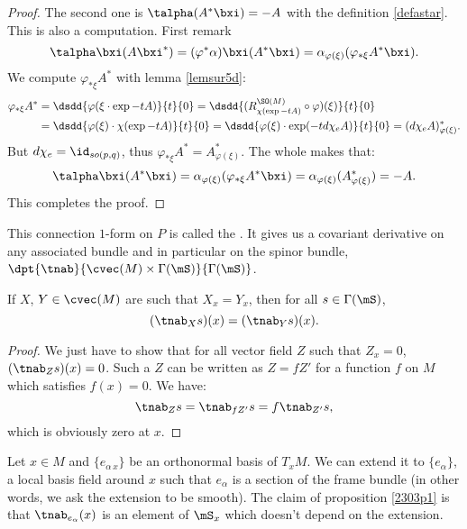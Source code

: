\begin{proof}
The second one is $\talpha(A^*\bxi)=-A$ with the definition \eqref{defastar}. This is also a computation. First remark
\[
 \talpha\bxi(A\bxi^*)=(\varphi^*\alpha)\bxi(A^*\bxi)=\alpha_{\varphi(\xi)}(\varphi_{*\xi}A^*\bxi).
\]
 We compute $\varphi_{*\xi}A^*$ with lemma \ref{lemsur5d}:
\begin{equation}
\begin{split}
 \varphi_{*\xi}A^*&=\dsdd{\varphi(\xi\cdot\exp -tA)}{t}{0} =\dsdd{(R_{\chi(\exp -tA)}^{\SO(M)}\circ\varphi)(\xi)}{t}{0}\\
              &=\dsdd{\varphi(\xi)\cdot\chi(\exp -tA)}{t}{0}=\dsdd{\varphi(\xi)\cdot\exp(-td\chi_eA)}{t}{0}=(d\chi_eA)^*_{\varphi(\xi)}.
\end{split}
\end{equation}
But $d\chi_e=\id_{so(p,q)}$, thus $\varphi_{*\xi}A^*=A^*_{\varphi(\xi)}$. The whole makes that:
\[
\talpha\bxi(A^*\bxi)=\alpha_{\varphi(\xi)}(\varphi_{*\xi}A^*\bxi)=\alpha_{\varphi(\xi)}(A^*_{\varphi(\xi)})=-A.
\] 
This completes the proof.
\end{proof}

\begin{definition}
This connection $1$-form on $P$ is called the . It gives us a covariant derivative on any associated bundle and in particular on the spinor bundle, $\dpt{\tnab}{\cvec(M)\times\Gamma(\mS)}{\Gamma(\mS)}$.
 \label{spinconn}
\end{definition}

\begin{proposition}
If $X$, $Y\in\cvec(M)$ are such that $X_x=Y_x$, then for all $s\in\Gamma(\mS)$,
\[
              (\tnab_Xs)(x)=(\tnab_Ys)(x).
\]
 \label{2303p1}
\end{proposition}
\begin{proof}
We just have to show that for all vector field $Z$ such that $Z_x=0$, $(\tnab_Zs)(x)=0$. Such a $Z$ can be written as $Z=fZ'$ for a function $f$ on $M$ which satisfies $f(x)=0$. We have:
\[
\tnab_Zs=\tnab_{fZ'}s=f\tnab_{Z'}s,
\]
which is obviously zero at $x$.
\end{proof}

Let $x\in M$ and $\{e_{\alpha\,x}\}$ be an orthonormal basis of $T_xM$. We can extend it to $\{e_{\alpha}\}$, a local basis field around $x$ such that $e_{\alpha}$ is a section of the frame bundle (in other words, we ask the extension to be smooth). The claim of proposition \ref{2303p1} is that $\tnab_{e_{\alpha}}(x)$ is an element of $\mS_x$ which doesn't depend on the extension.

